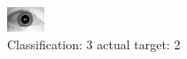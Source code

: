 \begin{figure}[h!]
\begin{center}
\includegraphics[width=0.60\columnwidth]{figures/ID1665_class_3_target_2.png}
\end{center}
\caption{ Classification: 3 actual target: 2}
\label{fig:ID1665_class_3_target_2}
\end{figure}
